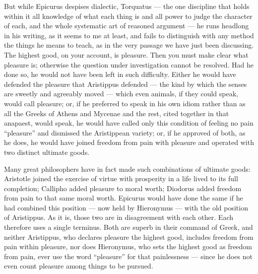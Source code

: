 But while Epicurus despises dialectic, Torquatus — the one discipline that holds within it all knowledge of what each thing is and all power to judge the character of each, and the whole systematic art of reasoned argument — he runs headlong in his writing, as it seems to me at least, and fails to distinguish with any method the things he means to teach, as in the very passage we have just been discussing. The highest good, on your account, is pleasure. Then you must make clear what pleasure is; otherwise the question under investigation cannot be resolved. Had he done so, he would not have been left in such difficulty. Either he would have defended the pleasure that Aristippus defended — the kind by which the senses are sweetly and agreeably moved — which even animals, if they could speak, would call pleasure; or, if he preferred to speak in his own idiom rather than as all the Greeks of Athens and Mycenae and the rest, cited together in that anapaest, would speak, he would have called only this condition of feeling no pain ``pleasure'' and dismissed the Aristippean variety; or, if he approved of both, as he does, he would have joined freedom from pain with pleasure and operated with two distinct ultimate goods.

Many great philosophers have in fact made such combinations of ultimate goods: Aristotle joined the exercise of virtue with prosperity in a life lived to its full completion; Callipho added pleasure to moral worth; Diodorus added freedom from pain to that same moral worth. Epicurus would have done the same if he had combined this position — now held by Hieronymus — with the old position of Aristippus. As it is, those two are in disagreement with each other. Each therefore uses a single terminus. Both are superb in their command of Greek, and neither Aristippus, who declares pleasure the highest good, includes freedom from pain within pleasure, nor does Hieronymus, who sets the highest good as freedom from pain, ever use the word ``pleasure'' for that painlessness — since he does not even count pleasure among things to be pursued.

